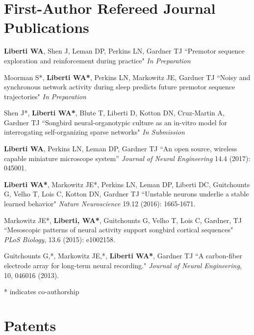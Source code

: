 \section{First-Author Refereed Journal Publications}
\vspace{-.1275in}
\begin{bibsection}

\item {\bf Liberti WA}, Shen J, Leman DP, Perkins LN, Gardner TJ  ``Premotor sequence exploration and reinforcement during practice" \emph{\color{Maroon} In Preparation}
\item Moorman S*, {\bf Liberti WA*},  Perkins LN, Markowitz JE, Gardner TJ  ``Noisy and synchronous network activity during sleep predicts future premotor sequence trajectories" \emph{\color{Maroon} In Preparation}
\item Shen J*, {\bf Liberti WA*},  Blute T, Liberti D, Kotton DN, Cruz-Martin A, Gardner TJ  ``Songbird neural-organotypic culture as an in-vitro model for interrogating self-organizing sparse networks" \emph{\color{Maroon} In Submission}
\item {\bf Liberti WA},  Perkins LN, Leman DP, Gardner TJ  ``An open source, wireless capable miniature microscope system'' \emph{ Journal of Neural Engineering} 14.4 (2017): 045001.
\item {\bf Liberti WA*}, Markowitz JE*, Perkins LN, Leman DP, Liberti DC, Guitchounts G, Velho T,  Lois C, Kotton DN, Gardner TJ  ``Unstable neurons underlie a stable learned behavior" \emph{ Nature Neuroscience} 19.12 (2016): 1665-1671.
\item Markowitz JE*, {\bf Liberti, WA*},  Guitchounts G, Velho T,  Lois C, Gardner, TJ  ``Mesoscopic patterns of neural activity support songbird cortical sequences" \emph{PLoS Biology}, 13.6 (2015): e1002158.
    \item  Guitchounts G,*, Markowitz JE,*, {\bf Liberti WA*}, Gardner TJ  ``A carbon-fiber electrode array for long-term neural recording." \emph{Journal of Neural Engineering}, 10, 046016 (2013).
   \end{bibsection}
   
* indicates co-authorship
%

\section{Patents}

